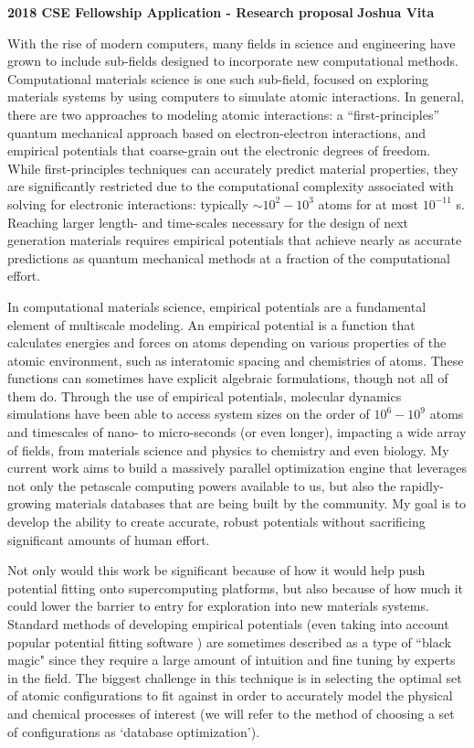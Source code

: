 \documentclass[11pt]{article}
\begin{document}
\begin{center}
    \textbf{2018 CSE Fellowship Application - Research proposal}
\hfill
\textbf{Joshua Vita}
\end{center}
\noindent\hrulefill

\bigskip

With the rise of modern computers, many fields in science and engineering have grown to include sub-fields designed to incorporate new computational methods. Computational materials science is one such sub-field, focused on exploring materials systems by using computers to simulate atomic interactions. In general, there are two approaches to modeling atomic interactions: a ``first-principles'' quantum mechanical approach based on electron-electron interactions, and empirical potentials that coarse-grain out the electronic degrees of freedom. While first-principles techniques can accurately predict material properties, they are significantly restricted due to the computational complexity associated with solving for electronic interactions: typically $\sim10^2-10^3$ atoms for at most $10^{-11}$ s. Reaching larger length- and time-scales necessary for the design of next generation materials requires empirical potentials that achieve nearly as accurate predictions as quantum mechanical methods at a fraction of the computational effort.

In computational materials science, empirical potentials are a fundamental element of multiscale modeling. An empirical potential is a function that calculates energies and forces on atoms depending on various properties of the atomic environment, such as interatomic spacing and chemistries of atoms. These functions can sometimes have explicit algebraic formulations, though not all of them do. Through the use of empirical potentials, molecular dynamics simulations have been able to access system sizes on the order of $10^6-10^9$ atoms and timescales of nano- to micro-seconds (or even longer), impacting a wide array of fields, from materials science and physics to chemistry and even biology. My current work aims to build a massively parallel optimization engine that leverages not only the petascale computing powers available to us, but also the rapidly-growing materials databases that are being built by the community. My goal is to develop the ability to create accurate, robust potentials without sacrificing significant amounts of human effort.


Not only would this work be significant because of how it would help push potential fitting onto supercomputing platforms, but also because of how much it could lower the barrier to entry for exploration into new materials systems. Standard methods of developing empirical potentials (even taking into account popular potential fitting software \cite{potfit}) are sometimes described as a type of ``black magic" since they require a large amount of intuition and fine tuning by experts in the field. The biggest challenge in this technique is in selecting the optimal set of atomic configurations to fit against in order to accurately model the physical and chemical processes of interest (we will refer to the method of choosing a set of configurations as `database optimization').
\end{document}
